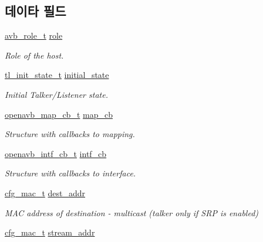 \subsection*{데이타 필드}
\begin{DoxyCompactItemize}
\item 
\hyperlink{openavb__types__base__pub_8h_a590fdc081b8544206aabd58e32a6f6a2}{avb\+\_\+role\+\_\+t} \hyperlink{structopenavb__tl__cfg__t_a172ec388c6d270261a61a789b78dff45}{role}
\begin{DoxyCompactList}\small\item\em Role of the host. \end{DoxyCompactList}\item 
\hyperlink{build_2sdk__eavb_2openavb__tl__pub_8h_a3db837d528f98176f3e7225a53d0abaa}{tl\+\_\+init\+\_\+state\+\_\+t} \hyperlink{structopenavb__tl__cfg__t_af00cb7d534b8d163f482aacb7bf9661d}{initial\+\_\+state}
\begin{DoxyCompactList}\small\item\em Initial Talker/\+Listener state. \end{DoxyCompactList}\item 
\hyperlink{structopenavb__map__cb__t}{openavb\+\_\+map\+\_\+cb\+\_\+t} \hyperlink{structopenavb__tl__cfg__t_a0a631fd45cd5f56f47a927e435f21a38}{map\+\_\+cb}
\begin{DoxyCompactList}\small\item\em Structure with callbacks to mapping. \end{DoxyCompactList}\item 
\hyperlink{structopenavb__intf__cb__t}{openavb\+\_\+intf\+\_\+cb\+\_\+t} \hyperlink{structopenavb__tl__cfg__t_a93f5e2efe8b8bbdac95c0beca4a2e236}{intf\+\_\+cb}
\begin{DoxyCompactList}\small\item\em Structure with callbacks to interface. \end{DoxyCompactList}\item 
\hyperlink{structcfg__mac__t}{cfg\+\_\+mac\+\_\+t} \hyperlink{structopenavb__tl__cfg__t_adafdd018fad617237267247e6680f87a}{dest\+\_\+addr}
\begin{DoxyCompactList}\small\item\em M\+AC address of destination -\/ multicast (talker only if S\+RP is enabled) \end{DoxyCompactList}\item 
\hyperlink{structcfg__mac__t}{cfg\+\_\+mac\+\_\+t} \hyperlink{structopenavb__tl__cfg__t_aad445ea3a27a465a885b5d56648ad282}{stream\+\_\+addr}

\end{DoxyCompactItemize}
